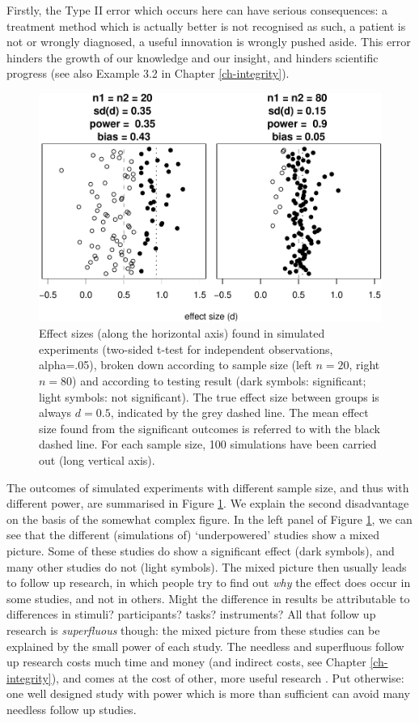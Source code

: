 \documentclass[
]{book}
\begin{document}
Firstly, the Type II error which occurs here can have serious consequences:
a treatment method which is actually better is not recognised as such,
a patient is not or wrongly diagnosed, a useful innovation is wrongly pushed
aside. This error hinders the growth of our knowledge and our insight, and hinders
scientific progress (see also
Example 3.2 in Chapter \ref{ch-integrity}).

\begin{figure}
\centering
\includegraphics{QMS-EN_files/figure-latex/underpoweredeffectsizes-1.pdf}
\caption{\label{fig:underpoweredeffectsizes}Effect sizes (along the horizontal axis) found in simulated experiments (two-sided t-test for independent observations, alpha=.05), broken down according to sample size (left \(n=20\), right \(n=80\)) and according to testing result (dark symbols: significant; light symbols: not significant). The true effect size between groups is always \(d=0.5\), indicated by the grey dashed line. The mean effect size found from the significant outcomes is referred to with the black dashed line. For each sample size, 100 simulations have been carried out (long vertical axis).}
\end{figure}

The outcomes of simulated experiments with different
sample size, and thus with different power, are summarised
in Figure \ref{fig:underpoweredeffectsizes}. We explain the second disadvantage on the basis of
the somewhat complex figure. In the left panel of Figure
\ref{fig:underpoweredeffectsizes}, we can see that the different
(simulations of) `underpowered' studies show a mixed
picture. Some of these studies do show a significant effect (dark symbols),
and many other studies do not (light symbols).
The mixed picture then usually leads to follow up research, in which
people try to find out \emph{why} the effect does occur in some studies,
and not in others. Might the difference in results be attributable
to differences in stimuli? participants? tasks?
instruments? All that follow up research is \emph{superfluous} though: the mixed
picture from these studies can be explained by the small
power of each study. The needless and superfluous follow up research
costs much time and money (and indirect costs,
see Chapter \ref{ch-integrity}), and comes at the cost of other, more useful
research \citep[p.118]{Schm96}. Put otherwise: one well designed study
with power which is more than sufficient can avoid many needless follow up studies.
\end{document}
